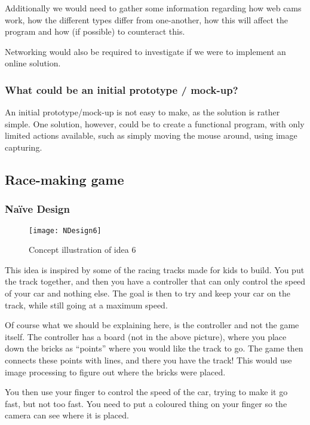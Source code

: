 Additionally we would need to gather some information regarding how web cams work, how the different types differ from one-another, how this will affect the program and how (if possible) to counteract this.
\bigskip

Networking would also be required to investigate if we were to implement an online solution.

\subsubsection*{What could be an initial prototype / mock-up?}
An initial prototype/mock-up is not easy to make, as the solution is rather simple. One solution, however, could be to create a functional program, with only limited actions available, such as simply moving the mouse around, using image capturing.

\pagebreak

\subsection{Race-making game} \label{nd6}
\subsubsection*{Naïve Design}
\begin{figure}[h]
\centering
\texttt{[image: NDesign6]}
\caption{Concept illustration of idea 6}
\label{fig:ndesign6}
\end{figure}

This idea is inspired by some of the racing tracks made for kids to build. You put the track together, and then you have a controller that can only control the speed of your car and nothing else. The goal is then to try and keep your car on the track, while still going at a maximum speed.
\bigskip

Of course what we should be explaining here, is the controller and not the game itself. The controller has a board (not in the above picture), where you place down the bricks as “points” where you would like the track to go. The game then connects these points with lines, and there you have the track! This would use image processing to figure out where the bricks were placed.
\bigskip

You then use your finger to control the speed of the car, trying to make it go fast, but not too fast. You need to put a coloured thing on your finger so the camera can see where it is placed.
\bigskip 

